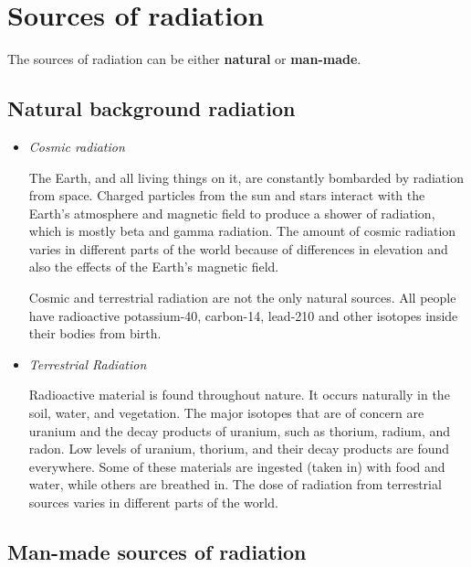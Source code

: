 



\section{Sources of radiation}
\label{sec:an:sources}

The sources of radiation can be either \textbf{natural} or \textbf{man-made}.

\subsection{Natural background radiation}

\begin{itemize}
\item{\textit{Cosmic radiation}

The Earth, and all living things on it, are constantly bombarded by radiation from space. Charged particles from the sun and stars interact with the Earth's atmosphere and magnetic field to produce a shower of radiation, which is mostly beta and gamma radiation. The amount of cosmic radiation varies in different parts of the world because of differences in elevation and also the effects of the Earth's magnetic field.
}
\begin{IFact}{
Cosmic and terrestrial radiation are not the only natural sources. All people have radioactive potassium-40, carbon-14, lead-210 and other isotopes inside their bodies from birth.
}
\end{IFact}
\item{\textit{Terrestrial Radiation}

Radioactive material is found throughout nature. It occurs naturally in the soil, water, and vegetation. The major isotopes that are of concern are uranium and the decay products of uranium, such as thorium, radium, and radon. Low levels of uranium, thorium, and their decay products are found everywhere. Some of these materials are ingested (taken in) with food and water, while others are breathed in. The dose of radiation from terrestrial sources varies in different parts of the world.
}
\end{itemize}

\subsection{Man-made sources of radiation}


